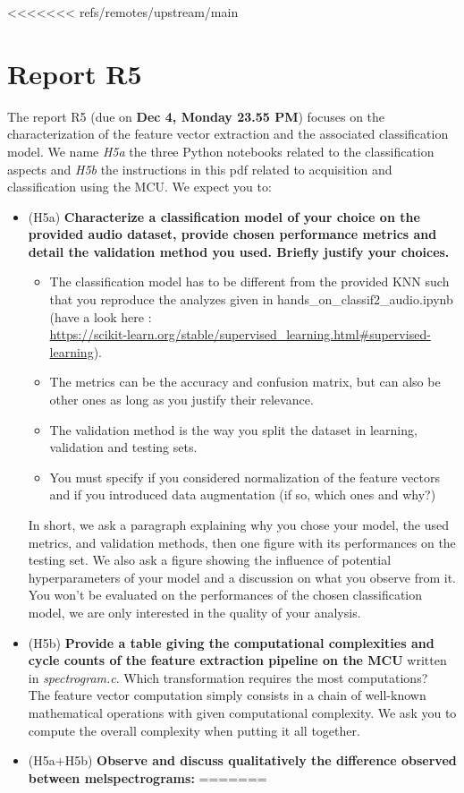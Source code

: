 <<<<<<< refs/remotes/upstream/main
\section{Report R5}
%
The report R5 (due on \textbf{Dec 4, Monday 23.55 PM}) focuses on the characterization of the feature vector extraction and the associated classification model. We name \emph{H5a} the three Python notebooks related to the classification aspects and \emph{H5b} the instructions in this pdf related to acquisition and classification using the MCU. We expect you to:
%
\begin{itemize}
    \item (H5a) \textbf{Characterize a classification model of your choice on the provided audio dataset, provide chosen performance metrics and detail the validation method you used. Briefly justify your choices.}
    \begin{itemize}
        \item The classification model has to be different from the provided KNN such that you reproduce the analyzes given in hands\_on\_classif2\_audio.ipynb (have a look here :\\ \url{https://scikit-learn.org/stable/supervised\_learning.html#supervised-learning}).
        \item The metrics can be the accuracy and confusion matrix, but can also be other ones as long as you justify their relevance.
        \item The validation method is the way you split the dataset in learning, validation and testing sets.
        \item You must specify if you considered normalization of the feature vectors and if you introduced data augmentation (if so, which ones and why?)
    \end{itemize}
    In short, we ask a paragraph explaining why you chose your model, the used metrics, and validation methods, then one figure with its performances on the testing set. We also ask a figure showing the influence of potential hyperparameters of your model and a discussion on what you observe from it. You won't be evaluated on the performances of the chosen classification model, we are only interested in the quality of your analysis.
    \item (H5b) \textbf{Provide a table giving the computational complexities and cycle counts of the feature extraction pipeline on the MCU} written in \emph{spectrogram.c}. Which transformation requires the most computations? \\
The feature vector computation simply consists in a chain of well-known mathematical operations with given computational complexity. We ask you to compute the overall complexity when putting it all together.
\item (H5a+H5b) \textbf{Observe and discuss qualitatively the difference observed between melspectrograms:} 
=======

\end{itemize}
